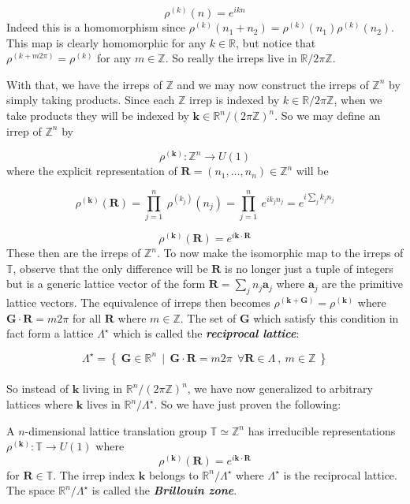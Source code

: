 \documentclass[9 pt]{report}
\def\*#1{\boldsymbol{#1}}
\begin{document}
$$ \rho^{(k)}(n) = e^{ikn} $$
Indeed this is a homomorphism since $\rho^{(k)}(n_1+n_2) = \rho^{(k)}(n_1)\rho^{(k)}(n_2)$. This map is clearly homomorphic for any $k\in\mathbb{R}$, but notice that $\rho^{(k+m2\pi)}=\rho^{(k)}$ for any $m\in \mathbb{Z}$. So really the irreps live in $\mathbb{R}/2\pi\mathbb{Z}$.

With that, we have the irreps of $\mathbb{Z}$ and we may now construct the irreps of $\mathbb{Z}^n$ by simply taking products. Since each $\mathbb{Z}$ irrep is indexed by $k\in\mathbb{R}/2\pi\mathbb{Z}$, when we take products they will be indexed by $\*k\in\mathbb{R}^n/(2\pi\mathbb{Z})^n$. So we may define an irrep of $\mathbb{Z}^n$ by 

$$ \rho^{(\*k)}: \mathbb{Z}^n \to U(1) $$
where the explicit representation of $\*R=(n_1,\dots, n_n)\in\mathbb{Z}^n$ will be 

$$ \rho^{(\*k)}(\*R) = \prod_{j=1}^n\:\rho^{(k_j)}(n_j) = \prod_{j=1}^n\:e^{ik_j n_j} = e^{i \sum_{j} k_j n_j} $$

$$ \rho^{(\*k)}(\*R) = e^{i\*k\cdot\*R} $$
These then are the irreps of $\mathbb{Z}^n$. To now make the isomorphic map to the irreps of $\mathbb{T}$, observe that the only difference will be $\*R$ is no longer just a tuple of integers but is a generic lattice vector of the form $\*R = \sum_j n_j\*a_j$ where $\*a_j$ are the primitive lattice vectors. The equivalence of irreps then becomes $\rho^{(\*k+\*G)}=\rho^{(\*k)}$ where $\*G \cdot\*R = m2\pi$ for all $\*R$ where $m\in\mathbb{Z}$. The set of $\*G$ which satisfy this condition in fact form a lattice $\Lambda^\star$ which is called the \textbf{\emph{reciprocal lattice}}:

$$ \Lambda^\star  = \left\{\: \*G \in\mathbb{R}^n\:\:|\:\:\*G\cdot\*R = m2\pi \:\:\forall\*R\in\Lambda\:,\:m\in\mathbb{Z} \: \right\}$$
\\
So instead of $\*k$ living in $\mathbb{R}^n/(2\pi\mathbb{Z})^n$, we have now generalized to arbitrary lattices where $\*k$ lives in $\mathbb{R}^n/\Lambda^\star$. So we have just proven the following: 

\begin{tcolorbox}
	A $n$-dimensional lattice translation group $\mathbb{T}\simeq \mathbb{Z}^n$ has irreducible representations $\rho^{(\*k)}:\mathbb{T}\to U(1)$ where 
	$$ \rho^{(\*k)}(\*R) = e^{i\*k\cdot\*R} $$
	for $\*R\in\mathbb{T}$. The irrep index $\*k$ belongs to $\mathbb{R}^n/\Lambda^\star$ where $\Lambda^\star$ is the reciprocal lattice. 
	\\
	The space $\mathbb{R}^n/\Lambda^\star$ is called the \textbf{\emph{Brillouin zone}}.
\end{tcolorbox}
\end{document}
